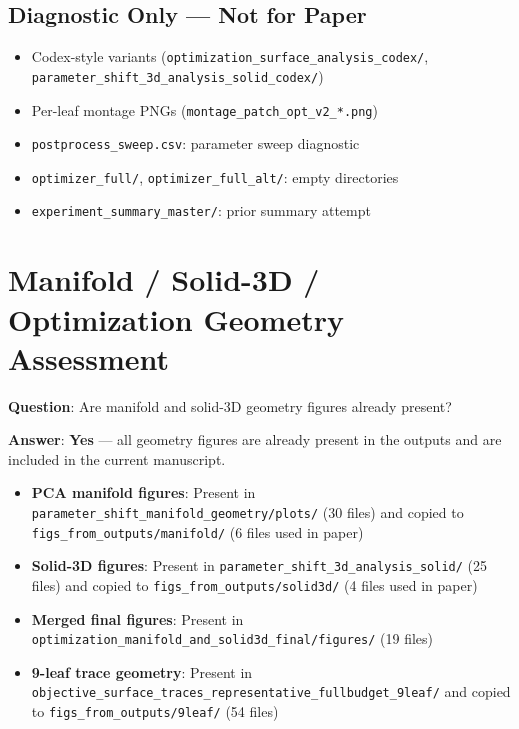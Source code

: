 \documentclass[11pt,a4paper]{article}
\newcommand{\filepath}[1]{\texttt{\small #1}}
\begin{document}
\subsection{Diagnostic Only --- Not for Paper}
\begin{itemize}[nosep]
  \item Codex-style variants (\filepath{optimization\_surface\_analysis\_codex/}, \filepath{parameter\_shift\_3d\_analysis\_solid\_codex/})
  \item Per-leaf montage PNGs (\filepath{montage\_patch\_opt\_v2\_*.png})
  \item \filepath{postprocess\_sweep.csv}: parameter sweep diagnostic
  \item \filepath{optimizer\_full/}, \filepath{optimizer\_full\_alt/}: empty directories
  \item \filepath{experiment\_summary\_master/}: prior summary attempt
\end{itemize}

\section{Manifold / Solid-3D / Optimization Geometry Assessment}

\textbf{Question}: Are manifold and solid-3D geometry figures already present?

\textbf{Answer}: \textbf{Yes} --- all geometry figures are already present in the outputs and are included in the current manuscript.

\begin{itemize}[nosep]
  \item \textbf{PCA manifold figures}: Present in \filepath{parameter\_shift\_manifold\_geometry/plots/} (30 files) and copied to \filepath{figs\_from\_outputs/manifold/} (6 files used in paper)
  \item \textbf{Solid-3D figures}: Present in \filepath{parameter\_shift\_3d\_analysis\_solid/} (25 files) and copied to \filepath{figs\_from\_outputs/solid3d/} (4 files used in paper)
  \item \textbf{Merged final figures}: Present in \filepath{optimization\_manifold\_and\_solid3d\_final/figures/} (19 files)
  \item \textbf{9-leaf trace geometry}: Present in \filepath{objective\_surface\_traces\_representative\_fullbudget\_9leaf/} and copied to \filepath{figs\_from\_outputs/9leaf/} (54 files)
\end{itemize}
\end{document}
